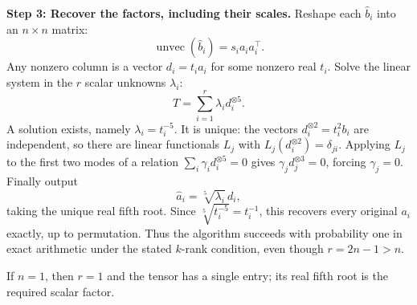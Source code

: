 \documentclass[12pt]{article}
\theoremstyle{plain}
\theoremstyle{definition}
\begin{document}
\begin{enumerate}
    \textbf{Step 3: Recover the factors, including their scales.}
    Reshape each \(\widehat b_i\) into an \(n\times n\) matrix:
    \[
    \operatorname{unvec}(\widehat b_i)=s_i a_i a_i^\top.
    \]
    Any nonzero column is a vector \(d_i=t_i a_i\) for some
    nonzero real \(t_i\). Solve the linear system in the \(r\)
    scalar unknowns \(\lambda_i\):
    \[
    T=\sum_{i=1}^r\lambda_i d_i^{\otimes5}.
    \]
    A solution exists, namely \(\lambda_i=t_i^{-5}\). It is unique:
    the vectors \(d_i^{\otimes2}=t_i^2b_i\) are independent, so there
    are linear functionals \(L_j\) with
    \(L_j(d_i^{\otimes2})=\delta_{ji}\). Applying \(L_j\) to the
    first two modes of a relation
    \(\sum_i\gamma_i d_i^{\otimes5}=0\) gives
    \(\gamma_j d_j^{\otimes3}=0\), forcing \(\gamma_j=0\).
    Finally output
    \[
    \widehat a_i=\sqrt[5]{\lambda_i}\,d_i,
    \]
    taking the unique real fifth root. Since
    \(\sqrt[5]{t_i^{-5}}=t_i^{-1}\), this recovers every original
    \(a_i\) exactly, up to permutation. Thus the algorithm succeeds
    with probability one in exact arithmetic under the stated
    \(k\)-rank condition, even though \(r=2n-1>n\).

    If \(n=1\), then \(r=1\) and the tensor has a single entry;
    its real fifth root is the required scalar factor.
\end{enumerate}
\newpage
\end{document}
